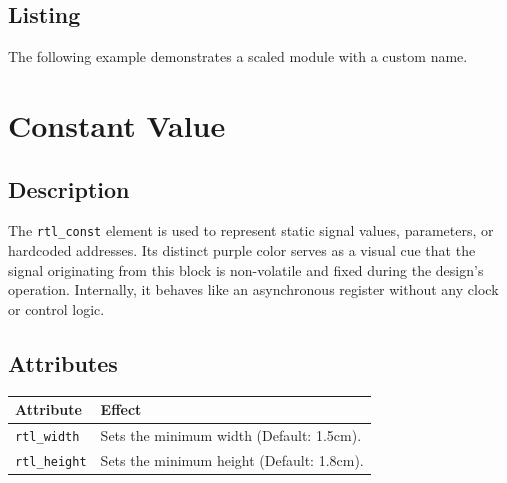     \subsection{\sffamily Listing}
        The following example demonstrates a scaled module with a custom name.

\begin{RTLexample}
\end{RTLexample}

\section{\sffamily Constant Value}

    \subsection{\sffamily Description}
        The \texttt{rtl\_const} element is used to represent static signal values, parameters, or hardcoded addresses. Its distinct purple color serves as a visual cue that the signal originating from this block is non-volatile and fixed during the design's operation. 
        Internally, it behaves like an asynchronous register without any clock or control logic.

    \subsection{\sffamily Attributes}
    \begin{center}
        \begin{tabular}{lp{8cm}}
        \toprule
            \textbf{Attribute} & \textbf{Effect} \\
            \midrule
            \texttt{rtl\_width} & Sets the minimum width (Default: 1.5cm). \\
            \texttt{rtl\_height} & Sets the minimum height (Default: 1.8cm). \\
            \bottomrule
        \end{tabular}
    \end{center}

